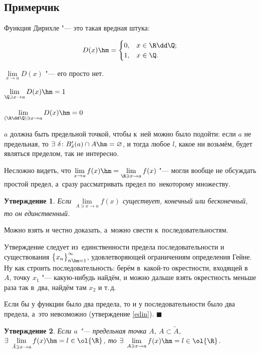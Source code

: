 \documentclass[a4paper,10pt,twoside]{article}
\newtheorem{Ut}{Утверждение}[section]
\newenvironment{Proof}
       {\par\noindent{\textbf{Доказательство.}}}
       {\hfill$\scriptstyle\blacksquare$}
\begin{document}
    \subsection{Примерчик}

    Функция Дирихле "--- это такая вредная штука:

    \[
        D(x)\hm=\begin{cases}
        0,&x\in\R\dd\Q;\\
        1,&x\in \Q.
        \end{cases}
    \]

    $\lim\limits_{x\to a} D(x)$ "--- его просто нет.

    $\lim\limits_{\Q\ni x\to a} D(x)\hm=1$

    $\lim\limits_{(\R\dd \Q)\ni x\to a} D(x)\hm=0$

    $a$ должна быть предельной точкой, чтобы к~ней можно было подойти: если $a$ не предельная, то $\exists\  \delta\colon B'_\delta(a)\cap A\hm=\varnothing$, и тогда любое $l$, какое ни возьмём, будет являться пределом, так не интересно.

    Несложно видеть, что $\lim\limits_{x\to a}f(x)\hm=\lim\limits_{\R\ni x\to a}f(x)$ "--- могли вообще не обсуждать простой предел, а~сразу рассматривать предел по~некоторому множеству.

    \begin{Ut}\label{edprmn}
    Если $\lim\limits_{A\ni x\to a}f(x)$ существует, конечный или бесконечный, то он единственный.
            \end{Ut}

    \begin{Proof}
        Можно взять и честно доказать, а~можно свести к~последовательностям.

        Утверждение следует из~единственности предела последовательности и существования $\big\{x_n\big\}_{n\hm=1}^\infty$, удовлетворяющей ограничениям определения Гейне. Ну как строить последовательность: берём в~какой-то окрестности, входящей в~$A$, точку $x_1$ "--- какую-нибудь найдём, и можно дальше взять окрестность меньше раза так в~два, найдём там $x_2$ и т.\,д.

        Если бы у функции было два предела, то и у последовательности было два предела, а~это невозможно (утверждение \ref{edin}).
    \end{Proof}

    \begin{Ut}\label{mpod}
        Если $a$ "--- предельная точка $A$, $A\subset \tilde A$, $\exists\ \lim\limits_{\tilde A\ni x\to a}f(x)\hm=l\in\ol{\R}$, то $\exists\ 
        \lim\limits_{A\ni x\to a}f(x)\hm=l\in\ol{\R}$.
    \end{Ut}
\end{document}
